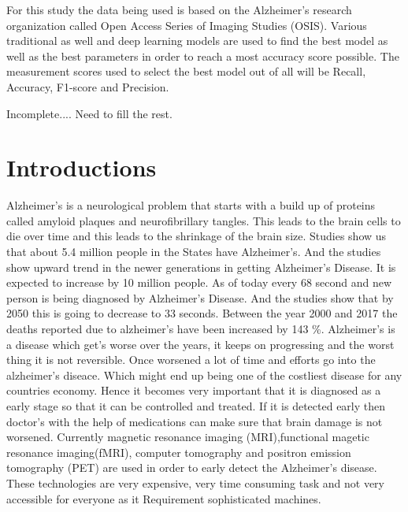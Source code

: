 \documentclass[12pt,onecolumn]{report}
\begin{document}
For this study the data being used is based on the Alzheimer's research organization called Open Access Series of Imaging Studies (OSIS). Various traditional as well and deep learning models are used to find the best model as well as the best parameters in order to reach a most accuracy score possible. The measurement scores used to select the best model out of all will be Recall, Accuracy, F1-score and Precision. 

Incomplete.... Need to fill the rest.



\tableofcontents
\listoffigures %
\listoftables  %

\chapter{Introductions}

Alzheimer's is a neurological problem that starts with a build up of proteins called amyloid plaques and neurofibrillary tangles. This leads to the brain cells to die over time and this leads to the shrinkage of the brain size\cite{mayo_alzheimers_2024}. Studies show us that about 5.4 million people in the States have Alzheimer's. And the studies show upward trend in the newer generations in getting Alzheimer's Disease. It is expected to increase by 10 million people. As of today every 68 second and new person is being diagnosed by Alzheimer's Disease. And the studies show that by 2050 this is going to decrease to 33 seconds\cite{2012131}. Between the year 2000 and 2017 the deaths reported due to alzheimer's have been increased by 143 \%\cite{2019321}. Alzheimer's is a disease which get's worse over the years, it keeps on progressing and the worst thing it is not reversible. Once worsened a lot of time and efforts go into the alzheimer's diseace. Which might end up being one of the costliest disease for any countries economy\cite{10.3389/fnagi.2024.1363458}. Hence it becomes very important that it is diagnosed as a early stage so that it can be controlled and treated. If it is detected early then doctor's with the help of medications can make sure that brain damage is not worsened. Currently magnetic resonance imaging (MRI),functional magetic resonance imaging(fMRI), computer tomography and positron emission tomography (PET) are used in order to early detect the Alzheimer's disease. These technologies are very expensive, very time consuming task and not very accessible for everyone as it Requirement sophisticated machines.
\end{document}
